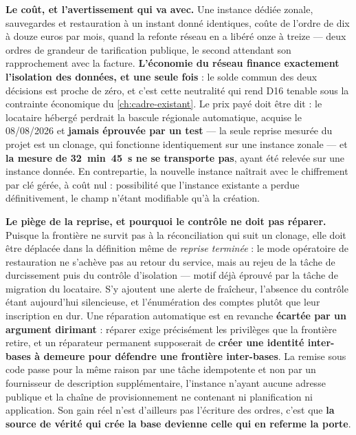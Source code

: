 \medskip
\noindent\textbf{Le coût, et l'avertissement qui va avec.}
Une instance dédiée zonale, sauvegardes et restauration à un instant donné identiques, coûte de
l'ordre de dix à douze euros par mois, quand la refonte réseau en a libéré onze à treize --- deux
ordres de grandeur de tarification publique, le second attendant son rapprochement avec la facture.
\textbf{L'économie du réseau finance exactement l'isolation des données, et une seule fois} : le
solde commun des deux décisions est proche de zéro, et c'est cette neutralité qui rend D16 tenable
sous la contrainte économique du \cref{ch:cadre-existant}. Le prix payé doit être dit : le
locataire hébergé perdrait la bascule régionale automatique, acquise le 08/08/2026 et
\textbf{jamais éprouvée par un test} --- la seule reprise mesurée du projet est un clonage, qui
fonctionne identiquement sur une instance zonale --- et \textbf{la mesure de 32~min~45~s ne se
transporte pas}, ayant été relevée sur une instance donnée. En contrepartie, la nouvelle instance
naîtrait avec le chiffrement par clé gérée, à coût nul : possibilité que l'instance existante a
perdue définitivement, le champ n'étant modifiable qu'à la création.

\medskip
\noindent\textbf{Le piège de la reprise, et pourquoi le contrôle ne doit pas réparer.}
Puisque la frontière ne survit pas à la réconciliation qui suit un clonage, elle doit être déplacée
dans la définition même de \emph{reprise terminée} : le mode opératoire de restauration ne s'achève
pas au retour du service, mais au rejeu de la tâche de durcissement puis du contrôle d'isolation
--- motif déjà éprouvé par la tâche de migration du locataire. S'y ajoutent une alerte de
fraîcheur, l'absence du contrôle étant aujourd'hui silencieuse, et l'énumération des comptes plutôt
que leur inscription en dur. Une réparation automatique est en revanche \textbf{écartée par un
argument dirimant} : réparer exige précisément les privilèges que la frontière retire, et un
réparateur permanent supposerait de \textbf{créer une identité inter-bases à demeure pour défendre
une frontière inter-bases}. La remise sous code passe pour la même raison par une tâche idempotente
et non par un fournisseur de description supplémentaire, l'instance n'ayant aucune adresse publique
et la chaîne de provisionnement ne contenant ni planification ni application. Son gain réel n'est
d'ailleurs pas l'écriture des ordres, c'est que \textbf{la source de vérité qui crée la base
devienne celle qui en referme la porte}.

